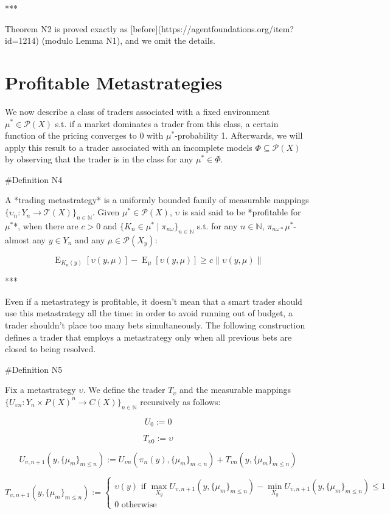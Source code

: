 \documentclass[a4paper]{article}
\DeclareMathOperator{\E}{E}
\newcommand{\Nats}{\mathbb{N}}
\newcommand{\Norm}[1]{\lVert #1 \rVert}
\newcommand{\Prob}{\mathcal{P}}
\newcommand{\T}{\mathcal{T}}
\begin{document}
***

Theorem N2 is proved exactly as [before](https://agentfoundations.org/item?id=1214) (modulo Lemma N1), and we omit the details.

\section{Profitable Metastrategies}

We now describe a class of traders associated with a fixed environment ${\mu^* \in \Prob(X)}$ s.t. if a market dominates a trader from this class, a certain function of the pricing converges to 0 with ${\mu^*}$-probability 1. Afterwards, we will apply this result to a trader associated with an incomplete models ${\Phi \subseteq \Prob(X)}$ by observing that the trader is in the class for any ${\mu^* \in \Phi}$.

\#Definition N4

A *trading metastrategy* is a uniformly bounded family of measurable mappings ${\{\upsilon_n: Y_n \rightarrow \T(X)\}_{n \in \Nats}}$. Given ${\mu^* \in \Prob(X)}$, ${\upsilon}$ is said said to be *profitable for ${\mu^*}$*, when there are ${c > 0}$ and ${\{K_n \in \mu^* \mid \pi_{n\omega}\}_{n \in \Nats}}$ s.t. for any ${n \in \Nats}$, ${\pi_{n\omega*}\mu^*}$-almost any ${y \in Y_n}$ and any ${\mu \in \Prob(X_y)}$:

$$\E_{K_n(y)}[\upsilon(y,\mu)] - \E_{\mu}[\upsilon(y,\mu)] \geq c \Norm{\upsilon(y,\mu)}$$

***

Even if a metastrategy is profitable, it doesn't mean that a smart trader should use this metastrategy all the time: in order to avoid running out of budget, a trader shouldn't place too many bets simultaneously. The following construction defines a trader that employs a metastrategy only when all previous bets are closed to being resolved.

\#Definition N5

Fix a metastrategy ${\upsilon}$. We define the trader ${T_\upsilon}$ and the measurable mappings ${\{U_{\upsilon  n}: Y_n \times P(X)^n \rightarrow C(X)\}_{n \in \Nats}}$ recursively as follows:
 
 $$U_0 := 0$$

$$T_{\upsilon0} := \upsilon$$

$$U_{\upsilon,n+1}(y, \{\mu_m\}_{m \leq n}) := U_{\upsilon n}(\pi_n(y), \{\mu_m\}_{m < n}) + T_{\upsilon n}(y, \{\mu_m\}_{m \leq n})$$

$$T_{\upsilon,n+1}(y, \{\mu_m\}_{m \leq n}) := \begin{cases}\upsilon(y) \text{ if } \max_{X_y} U_{\upsilon,n+1}(y,\{\mu_m\}_{m \leq n}) - \min_{X_y} U_{\upsilon,n+1}(y,\{\mu_m\}_{m \leq n})\leq 1\\0 \text{ otherwise}\end{cases}$$
\end{document}
